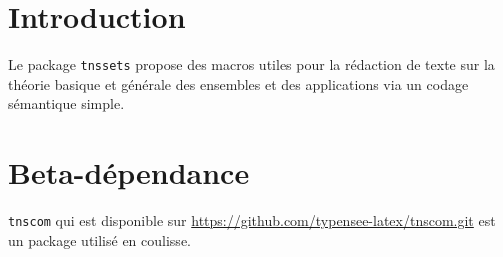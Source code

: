 \documentclass[12pt,a4paper]{article}
\begin{document}
\section{Introduction}

Le package \verb+tnssets+ propose des macros utiles pour la rédaction de texte sur la théorie basique et générale des ensembles et des applications via un codage sémantique simple.


\section{Beta-dépendance}

\verb#tnscom# qui est disponible sur \url{https://github.com/typensee-latex/tnscom.git} est un package utilisé en coulisse.
\end{document}
